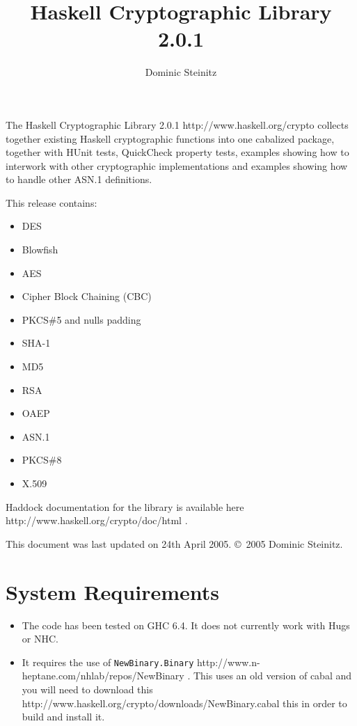 \documentclass{article}
\title{Haskell Cryptographic Library 2.0.1}
\author{Dominic Steinitz}
\begin{document}
\maketitle

The 
\htmladdnormallinkfoot
{Haskell Cryptographic Library 2.0.1}
{http://www.haskell.org/crypto}
collects together existing Haskell cryptographic
functions into one cabalized package, together with HUnit tests,
QuickCheck property tests, examples showing how to interwork with
other cryptographic implementations and examples showing how to 
handle other ASN.1 definitions.

This release contains:
\begin{itemize}
\item DES
\item Blowfish
\item AES
\item Cipher Block Chaining (CBC)
\item PKCS\#5 and nulls padding
\item SHA-1
\item MD5
\item RSA
\item OAEP
\item ASN.1
\item PKCS\#8
\item X.509
\end{itemize}

Haddock documentation for the library is available
\htmladdnormallinkfoot
{here}
{http://www.haskell.org/crypto/doc/html}
.

This document was last updated on 24th April 2005.
\copyright\ 2005 Dominic Steinitz. 

\section{System Requirements}

\begin{itemize}
\item
The code has been tested on GHC 6.4.
It does not currently work with Hugs or NHC. 
\item
It requires the use of
\htmladdnormallinkfoot
{{\tt NewBinary.Binary}}
{http://www.n-heptane.com/nhlab/repos/NewBinary}
.
This uses an old version of cabal and you will need to download 
\htmladdnormallinkfoot
{this}
{http://www.haskell.org/crypto/downloads/NewBinary.cabal}
this
in order to build and install it.
\end{itemize}
\end{document}
